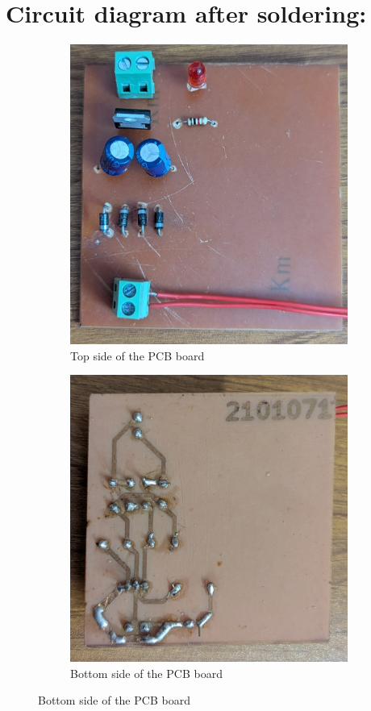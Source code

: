 \documentclass[a4paper,12pt]{article}
\begin{document}
	\section*{Circuit diagram after soldering:}
	
	\begin{figure}[H]
		\centering
		\begin{subfigure}[t]{1\textwidth}
			\centering
			\includegraphics[width=0.5\linewidth]{Images/1}
			\caption{ Top side of the PCB board}
			\vspace{2cm}
		\end{subfigure}
		
		\begin{subfigure}[t]{1\textwidth}
			\centering
			\includegraphics[width=0.5\linewidth]{Images/2}
			\caption{ Bottom side of the PCB board}
		\end{subfigure}
	\end{figure}
	
	\newpage
\end{document}
